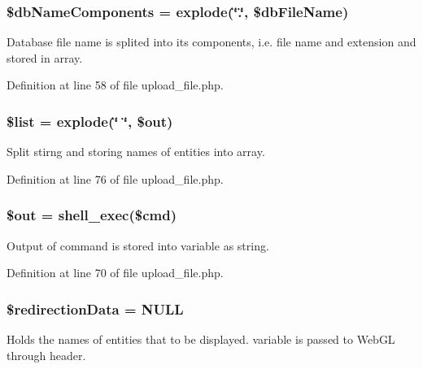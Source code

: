\hypertarget{upload__file_8php_a82064fc59286d59cc519da100ff37a03}{
\subsubsection[{\$db\-Name\-Components}]{\setlength{\rightskip}{0pt plus 5cm}\$db\-Name\-Components = explode(\char`\"{}.\char`\"{}, \$db\-File\-Name)}}\label{upload__file_8php_a82064fc59286d59cc519da100ff37a03}
Database file name is splited into its components, i.\-e. file name and extension and stored in array. 

Definition at line 58 of file upload\-\_\-file.\-php.

\hypertarget{upload__file_8php_a358b00350db3d8f227d500337cc437af}{
\subsubsection[{\$list}]{\setlength{\rightskip}{0pt plus 5cm}\$list = explode(\char`\"{} \char`\"{}, \$out)}}\label{upload__file_8php_a358b00350db3d8f227d500337cc437af}
Split stirng and storing names of entities into array. 

Definition at line 76 of file upload\-\_\-file.\-php.

\hypertarget{upload__file_8php_a48cb304902320d173a4eaa41543327b9}{
\subsubsection[{\$out}]{\setlength{\rightskip}{0pt plus 5cm}\$out = shell\-\_\-exec(\$cmd)}}\label{upload__file_8php_a48cb304902320d173a4eaa41543327b9}
Output of command is stored into variable as string. 

Definition at line 70 of file upload\-\_\-file.\-php.

\hypertarget{upload__file_8php_a4bfc4abb42c1a5571cc275eb8dc0de4c}{
\subsubsection[{\$redirection\-Data}]{\setlength{\rightskip}{0pt plus 5cm}\$redirection\-Data = N\-U\-L\-L}}\label{upload__file_8php_a4bfc4abb42c1a5571cc275eb8dc0de4c}
Holds the names of entities that to be displayed. variable is passed to Web\-G\-L through header. 

